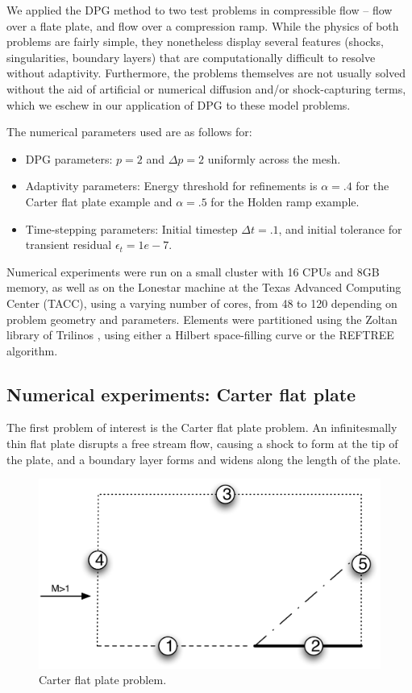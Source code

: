We applied the DPG method to two test problems in compressible flow -- flow over a flate plate, and flow over a compression ramp.  While the physics of both problems are fairly simple, they nonetheless display several features (shocks, singularities, boundary layers) that are computationally difficult to resolve without adaptivity.  Furthermore, the problems themselves are not usually solved without the aid of artificial or numerical diffusion and/or shock-capturing terms, which we eschew in our application of DPG to these model problems.

The numerical parameters used are as follows for:
\begin{itemize}
\item{DPG parameters:} $p = 2$ and $\Delta p = 2$ uniformly across the mesh. 
\item{Adaptivity parameters:} Energy threshold for refinements is $\alpha = .4$ for the Carter flat plate example and $\alpha = .5$ for the Holden ramp example.  
\item{Time-stepping parameters:} Initial timestep $\Delta t = .1$, and initial tolerance for transient residual $\epsilon_t = 1e-7$.
\end{itemize}

Numerical experiments were run on a small cluster with 16 CPUs and 8GB memory, as well as on the Lonestar machine at the Texas Advanced Computing Center (TACC), using a varying number of cores, from 48 to 120 depending on problem geometry and parameters.  Elements were partitioned using the Zoltan library of Trilinos \cite{ZoltanOverviewArticle}, using either a Hilbert space-filling curve or the REFTREE \cite{REFTREE} algorithm.  

\subsection{Numerical experiments: Carter flat plate}

The first problem of interest is the Carter flat plate problem\cite{Carter}. An infinitesmally thin flat plate disrupts a free stream flow, causing a shock to form at the tip of the plate, and a boundary layer forms and widens along the length of the plate.  

\begin{figure}
\centering
\includegraphics[scale=.7]{figs/flat_plate_BCs.pdf}
\caption{Carter flat plate problem.}
\end{figure}

